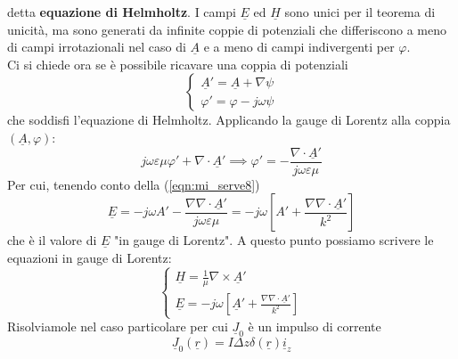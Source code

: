 \documentclass{book}
\begin{document}
            detta \textbf{equazione di Helmholtz}.
            I campi $\underline{E}$ ed $\underline{H}$ sono unici per il teorema di unicità, ma sono generati da infinite coppie di potenziali che differiscono a meno di campi irrotazionali nel caso di $\underline{A}$
            e a meno di campi indivergenti per $\varphi$.\\
            Ci si chiede ora se è possibile ricavare una coppia di potenziali
            \begin{equation}
                \begin{cases}
                    \underline{A}' = \underline{A}+\nabla \psi \\
                    \varphi ' = \varphi - j \omega \psi  
                \end{cases}
            \end{equation}
            che soddisfi l'equazione di Helmholtz. Applicando la gauge di Lorentz alla coppia $(\underline{A}, \varphi)$:
            \begin{equation}
                j \omega \varepsilon \mu \varphi ' + \nabla \cdot \underline{A}' \implies \varphi ' = - \frac{\nabla \cdot \underline{A} '}{j \omega \varepsilon \mu}
            \end{equation}
            Per cui, tenendo conto della (\ref{eqn:mi_serve8})
            \begin{equation}
                \underline{E} = -j \omega A' - \frac{\nabla \nabla \cdot \underline{A}'}{j \omega \varepsilon \mu} = -j \omega  [A'+\frac{\nabla \nabla \cdot \underline{A} '}{k^{2}}]
            \end{equation}
            che è il valore di $\underline{E}$ "in gauge di Lorentz". A questo punto possiamo scrivere le equazioni in gauge di Lorentz:
            \begin{equation}
                \begin{cases}
                    \displaystyle \underline{H} = \frac{1}{\mu} \nabla \times \underline{A}' \\
                    \displaystyle \underline{E} = -j \omega [\underline{A}' + \frac{\nabla \nabla \cdot \underline{A}'}{k^{2}}]
                \end{cases}
            \end{equation}
            Risolviamole nel caso particolare per cui $\underline{J}_{0}$ è un impulso di corrente
            \begin{equation}
                \underline{J}_{0}(\underline{r}) = I \Delta z \delta(\underline{r}) \underline{i}_{z}
            \end{equation}
\end{document}
